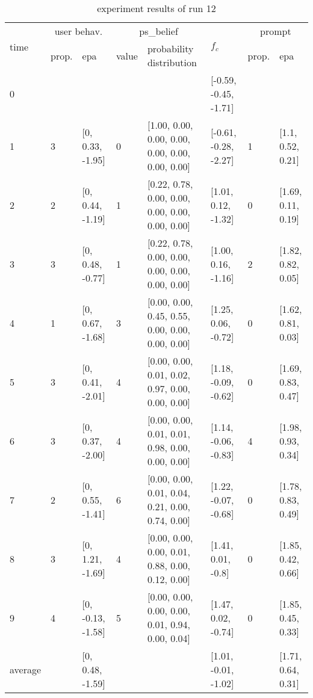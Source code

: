 

\begin{table}[htbp]\footnotesize
\caption{experiment results of run 12}
\begin{center}
\begin{tabular}{|p{0.4cm}|p{0.6cm}|l|p{0.6cm}|p{3.3cm}|l|p{0.6cm}|l|}
\hline

\multirow{2}{*}{time} & \multicolumn{2}{c|}{user behav.} & \multicolumn{2}{c|}{ps\_belief} &
\multirow{2}{*}{$f_c$} & \multicolumn{2}{c|}{prompt} \\ \cline{2-5}\cline{ 7- 8}
& prop. & epa & value & probability distribution &  & prop. & epa \\ \hline

0 & \multicolumn{1}{l|}{} &  & \multicolumn{1}{l|}{} &  & [-0.59, -0.45, -1.71] & \multicolumn{1}{l|}{} &  \\ \hline
1 & 3 & [0, 0.33, -1.95] & 0 & [1.00, 0.00, 0.00, 0.00, 0.00, 0.00, 0.00, 0.00] & [-0.61, -0.28, -2.27] & 1 & [1.1, 0.52, 0.21] \\ \hline
2 & 2 & [0, 0.44, -1.19] & 1 & [0.22, 0.78, 0.00, 0.00, 0.00, 0.00, 0.00, 0.00] & [1.01, 0.12, -1.32] & 0 & [1.69, 0.11, 0.19] \\ \hline
3 & 3 & [0, 0.48, -0.77] & 1 & [0.22, 0.78, 0.00, 0.00, 0.00, 0.00, 0.00, 0.00] & [1.00, 0.16, -1.16] & 2 & [1.82, 0.82, 0.05] \\ \hline
4 & 1 & [0, 0.67, -1.68] & 3 & [0.00, 0.00, 0.45, 0.55, 0.00, 0.00, 0.00, 0.00] & [1.25, 0.06, -0.72] & 0 & [1.62, 0.81, 0.03] \\ \hline
5 & 3 & [0, 0.41, -2.01] & 4 & [0.00, 0.00, 0.01, 0.02, 0.97, 0.00, 0.00, 0.00] & [1.18, -0.09, -0.62] & 0 & [1.69, 0.83, 0.47] \\ \hline
6 & 3 & [0, 0.37, -2.00] & 4 & [0.00, 0.00, 0.01, 0.01, 0.98, 0.00, 0.00, 0.00] & [1.14, -0.06, -0.83] & 4 & [1.98, 0.93, 0.34] \\ \hline
7 & 2 & [0, 0.55, -1.41] & 6 & [0.00, 0.00, 0.01, 0.04, 0.21, 0.00, 0.74, 0.00] & [1.22, -0.07, -0.68] & 0 & [1.78, 0.83, 0.49] \\ \hline
8 & 3 & [0, 1.21, -1.69] & 4 & [0.00, 0.00, 0.00, 0.01, 0.88, 0.00, 0.12, 0.00] & [1.41, 0.01, -0.8] & 0 & [1.85, 0.42, 0.66] \\ \hline
9 & 4 & [0, -0.13, -1.58] & 5 & [0.00, 0.00, 0.00, 0.00, 0.01, 0.94, 0.00, 0.04] & [1.47, 0.02, -0.74] & 0 & [1.85, 0.45, 0.33] \\ \hline
\multicolumn{1}{|l|}{average} & \multicolumn{1}{l|}{} & [0, 0.48, -1.59] & \multicolumn{1}{l|}{} &  & [1.01, -0.01, -1.02] & \multicolumn{1}{l|}{} & [1.71, 0.64, 0.31] \\ \hline
\end{tabular}
\end{center}
\label{}
\end{table}


